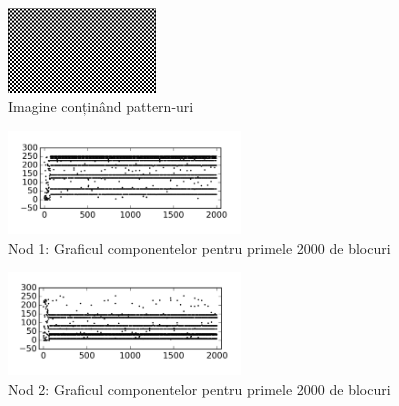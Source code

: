 \documentclass[oneside, 12pt]{book}
\begin{document}
\begin{figure}[b]
\begin{center}
\includegraphics[width=0.35\textwidth]{img/carouri.png}    %
\caption{Imagine conținând pattern-uri} 
\label{fig:carouri}
\end{center}
\end{figure}


\begin{figure}[h!]
\begin{center}
\includegraphics[width=0.55\textwidth]{img/carouri_db1.png}    %
\caption{Nod 1: Graficul componentelor pentru primele 2000 de blocuri} 
\label{fig:carouri_db1}
\end{center}
\end{figure}

\begin{figure}[h!]
\begin{center}
\includegraphics[width=0.55\textwidth]{img/carouri_db2.png}    %
\caption{Nod 2: Graficul componentelor pentru primele 2000 de blocuri} 
\label{fig:carouri_db2}
\end{center}
\end{figure}
\end{document}
